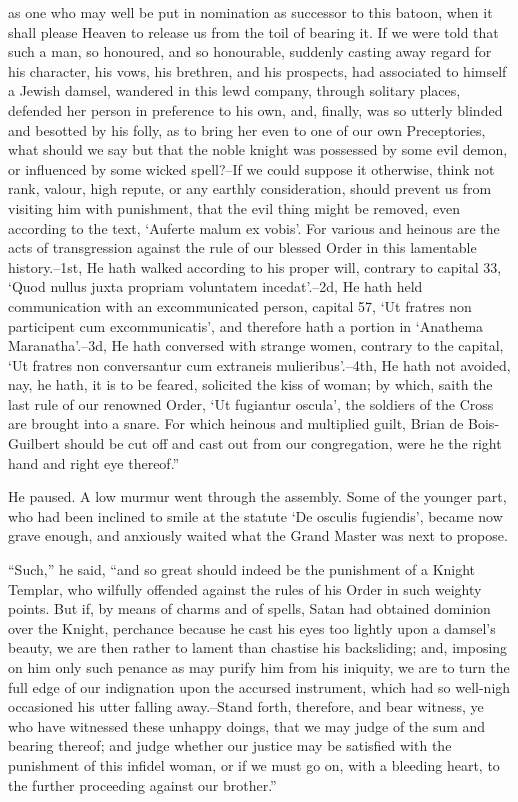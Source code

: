 as one who may well be put in nomination as successor to this batoon,
when it shall please Heaven to release us from the toil of bearing it.
If we were told that such a man, so honoured, and so honourable,
suddenly casting away regard for his character, his vows, his brethren,
and his prospects, had associated to himself a Jewish damsel, wandered
in this lewd company, through solitary places, defended her person in
preference to his own, and, finally, was so utterly blinded and besotted
by his folly, as to bring her even to one of our own Preceptories, what
should we say but that the noble knight was possessed by some evil
demon, or influenced by some wicked spell?--If we could suppose it
otherwise, think not rank, valour, high repute, or any earthly
consideration, should prevent us from visiting him with punishment, that
the evil thing might be removed, even according to the text, `Auferte
malum ex vobis'. For various and heinous are the acts of transgression
against the rule of our blessed Order in this lamentable history.--1st,
He hath walked according to his proper will, contrary to capital 33,
`Quod nullus juxta propriam voluntatem incedat'.--2d, He hath held
communication with an excommunicated person, capital 57, `Ut fratres non
participent cum excommunicatis', and therefore hath a portion in
`Anathema Maranatha'.--3d, He hath conversed with strange women,
contrary to the capital, `Ut fratres non conversantur cum extraneis
mulieribus'.--4th, He hath not avoided, nay, he hath, it is to be
feared, solicited the kiss of woman; by which, saith the last rule of
our renowned Order, `Ut fugiantur oscula', the soldiers of the Cross are
brought into a snare. For which heinous and multiplied guilt, Brian de
Bois-Guilbert should be cut off and cast out from our congregation, were
he the right hand and right eye thereof.''

He paused. A low murmur went through the assembly. Some of the younger
part, who had been inclined to smile at the statute `De osculis
fugiendis', became now grave enough, and anxiously waited what the Grand
Master was next to propose.

``Such,'' he said, ``and so great should indeed be the punishment of a
Knight Templar, who wilfully offended against the rules of his Order in
such weighty points. But if, by means of charms and of spells, Satan had
obtained dominion over the Knight, perchance because he cast his eyes
too lightly upon a damsel's beauty, we are then rather to lament than
chastise his backsliding; and, imposing on him only such penance as may
purify him from his iniquity, we are to turn the full edge of our
indignation upon the accursed instrument, which had so well-nigh
occasioned his utter falling away.--Stand forth, therefore, and bear
witness, ye who have witnessed these unhappy doings, that we may judge
of the sum and bearing thereof; and judge whether our justice may be
satisfied with the punishment of this infidel woman, or if we must go
on, with a bleeding heart, to the further proceeding against our
brother.''

